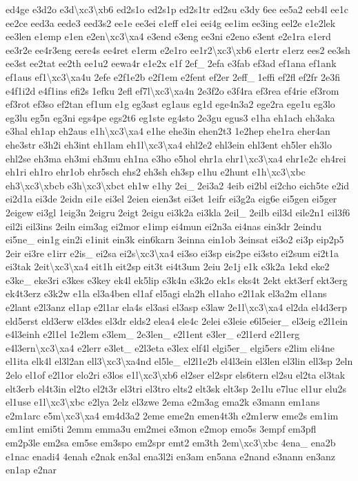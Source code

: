 {ed4ge e3d2o e3d\textbackslash{}xc3\textbackslash{}xb6 ed2s1o ed2s1p ed2s1tr ed2su e3dy 6ee ee5a2 eeb4l ee1c ee2ce eed3a eede3 eed3s2 ee1e ee3ei e1eff e1ei eei4g ee1im ee3ing eel2e e1e2lek ee3len e1emp e1en e2en\textbackslash{}xc3\textbackslash{}xa4 e3end e3eng ee3ni e2eno e3ent e2e1ra e1erd ee3r2e ee4r3eng eere4s ee4ret e1erm e2e1ro ee1r2\textbackslash{}xc3\textbackslash{}xb6 e1ertr e1erz ees2 ee3sh ee3st ee2tat ee2th ee1u2 eewa4r e1e2x e1f 2ef\-\_\- 2efa e3fab ef3ad ef1ana ef1ank ef1aus ef1\textbackslash{}xc3\textbackslash{}xa4u 2efe e2f1e2b e2f1em e2fent ef2er 2eff\-\_\- 1effi ef2fl ef2fr 2e3fi e4f1i2d e4f1ins efi2s 1efku 2efl ef7l\textbackslash{}xc3\textbackslash{}xa4n 2e3f2o e3f4ra ef3rea ef4rie ef3rom ef3rot ef3so ef2tan ef1um e1g eg3ast eg1aus eg1d ege4n3a2 ege2ra ege1u eg3lo eg3lu eg5n eg3ni egs4pe egs2t6 eg1ste eg4sto 2e3gu egus3 e1ha eh1ach eh3aka e3hal eh1ap eh2aus e1h\textbackslash{}xc3\textbackslash{}xa4 e1he ehe3in ehen2t3 1e2hep ehe1ra eher4an ehe3str e3h2i eh3int eh1lam eh1l\textbackslash{}xc3\textbackslash{}xa4 ehl2e2 ehl3ein ehl3ent eh5ler eh3lo ehl2se eh3ma eh3mi eh3mu eh1na e3ho e5hol ehr1a ehr1\textbackslash{}xc3\textbackslash{}xa4 ehr1e2c eh4rei eh1ri eh1ro ehr1ob ehr5sch ehs2 eh3sh eh3sp e1hu e2hunt e1h\textbackslash{}xc3\textbackslash{}xbc eh3\textbackslash{}xc3\textbackslash{}xbcb e3h\textbackslash{}xc3\textbackslash{}xbct eh1w e1hy 2ei\-\_\- 2ei3a2 4eib ei2bl ei2cho eich5te e2id ei2d1a ei3de 2eidn ei1e ei3el 2eien eien3st ei3et 1eifr ei3g2a eig6e ei5gen ei5ger 2eigew ei3gl 1eig3n 2eigru 2eigt 2eigu ei3k2a ei3kla 2eil\-\_\- 2eilb eil3d eile2n1 eil3f6 eil2i eil3ins 2eiln eim3ag ei2mor e1imp ei4mun ei2n3a ei4nas ein3dr 2eindu ei5ne\-\_\- ein1g ein2i e1init ein3k ein6karn 3einna ein1ob 3einsat ei3o2 ei3p eip2p5 2eir ei3re e1irr e2is\-\_\- ei2sa ei2s\textbackslash{}xc3\textbackslash{}xa4 ei3so ei3sp eis2pe ei3sto ei2sum ei2t1a ei3tak 2eit\textbackslash{}xc3\textbackslash{}xa4 eit1h eit2sp eit3t ei4t3um 2eiu 2e1j e1k e3k2a 1ekd eke2 e3ke\-\_\- eke3ri e3kes e3key ek4l ek5lip e3k4n e3k2o ek1s eks4t 2ekt ekt3erf ekt3erg ek4t3erz e3k2w e1la el3a4ben el1af el5agi ela2h el1aho e2l1ak el3a2m el1ans e2lant e2l3anz el1ap e2l1ar ela4s el3asi el3asp e3law 2e1l\textbackslash{}xc3\textbackslash{}xa4 el2da el4d3erp eld5erst eld3erw el3des el3dr elds2 elea4 ele4c 2elei e3leie e6l5eier\-\_\- el3eig e2l1ein e4l3einh e2l1el 1e2lem e3lem\-\_\- 2e3len\-\_\- e2l1ent e3ler\-\_\- e2l1erd e2l1erg e4l3ern\textbackslash{}xc3\textbackslash{}xa4 e2lerr e3let\-\_\- e2l3eta e3lex elf4l elgi5er\-\_\- elgi5ers e2lim eli4ne el1ita elk4l el3l2an ell3\textbackslash{}xc3\textbackslash{}xa4nd el5le\-\_\- el2l1e2b el4l3ein el3len el3lin ell3sp 2eln 2elo el1of e2l1or elo2ri e3los e1l\textbackslash{}xc3\textbackslash{}xb6 el2ser el2spr els6tern el2su el2ta el3tak elt3erb el4t3in el2to el2t3r el3tri el3tro elts2 elt3sk elt3sp 2e1lu e7luc el1ur elu2s el1use e1l\textbackslash{}xc3\textbackslash{}xbc e2lya 2elz el3zwe 2ema e2m3ag ema2k e3mann em1ans e2m1arc e5m\textbackslash{}xc3\textbackslash{}xa4 em4d3a2 2eme eme2n emen4t3h e2m1erw eme2s em1im em1int emi5ti 2emm emma3u em2mei e3mon e2mop emo5s 3empf em3pfl em2p3le em2sa em5se em3spo em2spr emt2 em3th 2em\textbackslash{}xc3\textbackslash{}xbc 4ena\-\_\- ena2b e1nac enadi4 4enah e2nak en3al ena3l2i en3am en5ana e2nand e3nann en3anz en1ap e2nar }
